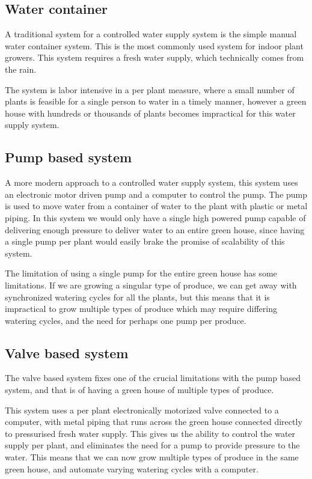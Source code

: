 \documentclass[a4paper,12pt,twoside,openright,titlepage]{book}
\begin{document}
\subsection{Water container}
A traditional system for a controlled water supply system is the simple manual water container system.
This is the most commonly used system for indoor plant growers. This system requires a fresh water supply, which technically comes from the rain.

The system is labor intensive in a per plant measure, where a small number of plants is feasible for a single person to water in a timely manner, however a green house with hundreds or thousands of plants becomes impractical for this water supply system.

\subsection{Pump based system}
A more modern approach to a controlled water supply system, this system uses an electronic motor driven pump and a computer to control the pump. The pump is used to move water from a container of water to the plant with plastic or metal piping. In this system we would only have a single high powered pump capable of delivering enough pressure to deliver water to an entire green house, since having a single pump per plant would easily brake the promise of scalability of this system.

The limitation of using a single pump for the entire green house has some limitations.
If we are growing a singular type of produce, we can get away with synchronized watering cycles for all the plants, but this means that it is impractical to grow multiple types of produce which may require differing watering cycles, and the need for perhaps one pump per produce.

\subsection{Valve based system}
The valve based system fixes one of the crucial limitations with the pump based system, and that is of having a green house of multiple types of produce.

This system uses a per plant electronically motorized valve connected to a computer, with metal piping that runs across the green house connected directly to pressurised fresh water supply.
This gives us the ability to control the water supply per plant, and eliminates the need for a pump to provide pressure to the water.
This means that we can now grow multiple types of produce in the same green house, and automate varying watering cycles with a computer.
\end{document}
